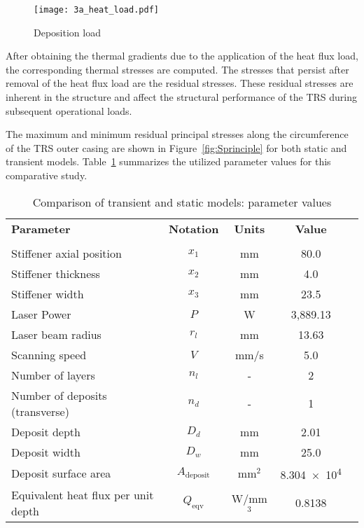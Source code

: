 \begin{figure}[h!]
    \centering
    \texttt{[image: 3a\_heat\_load.pdf]}
    \caption{ \label{fig:depload} Deposition load }
\end{figure}

After obtaining the thermal gradients due to the application of the heat flux load, the corresponding thermal stresses are computed. The stresses that persist after removal of the heat flux load are the residual stresses. These residual stresses are inherent in the structure and affect the structural performance of the \ac{TRS} during subsequent operational loads. 

The maximum and minimum residual principal stresses along the circumference of the \ac{TRS} outer casing are shown in Figure~\ref{fig:Sprinciple} for both static and transient models. Table~\ref{table:validation} summarizes the utilized parameter values for this comparative study.

\begin{table}[h!]
\centering
\renewcommand{\arraystretch}{1.0}%
\small\addtolength{\tabcolsep}{-5pt}
\caption{Comparison of transient and static models: parameter values}
\label{table:validation}
\begin{tabular}{lcccc}
\hline\hline
\bf Parameter & \bf Notation & \bf Units & \bf Value \\\\ \hline
Stiffener axial position & $x_1$ & mm & 80.0  \\
Stiffener thickness  & $x_2$ & mm & 4.0  \\
Stiffener width & $x_3$ & mm & 23.5  \\
Laser Power & ${P}$ & W & 3,889.13 \\ 
Laser beam radius & ${r_l}$ & mm & 13.63 \\ 
Scanning speed& ${V}$ & mm/s & 5.0 \\ 
Number of layers & $n_l$ & - & 2\\
Number of deposits (transverse) & $n_d$ & - & 1\\
Deposit depth  & $D_d$ & mm & 2.01\\
Deposit width  & $D_w$ & mm & 25.0 \\
Deposit surface area  & $A_\textrm{deposit}$ & mm$^2$ & \num{8.304e4} \\
Equivalent heat flux per unit depth & $Q_\textrm{eqv}$ & W/mm$^3$ & 0.8138 \\
\hline\hline
\end{tabular}
\end{table}


